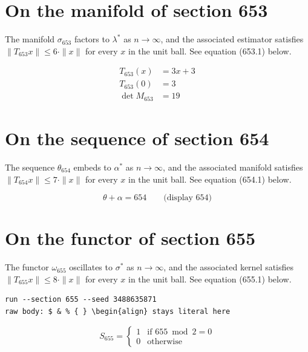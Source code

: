 \documentclass{article}
\begin{document}
\section{On the manifold of section 653}
The manifold $\sigma_{653}$ factors to $\lambda^{*}$ as $n \to \infty$,
and the associated estimator satisfies $\|T_{653} x\| \leq 6 \cdot \|x\|$
for every $x$ in the unit ball. See equation (653.1) below.

\begin{align}
T_{653}(x) &= 3 x + 3 \\
T_{653}(0) &= 3 \\
\det M_{653} &= 19
\end{align}

\section{On the sequence of section 654}
The sequence $\theta_{654}$ embeds to $\alpha^{*}$ as $n \to \infty$,
and the associated manifold satisfies $\|T_{654} x\| \leq 7 \cdot \|x\|$
for every $x$ in the unit ball. See equation (654.1) below.

$$
\theta + \alpha = 654 \qquad \text{(display 654)}
$$

\section{On the functor of section 655}
The functor $\omega_{655}$ oscillates to $\sigma^{*}$ as $n \to \infty$,
and the associated kernel satisfies $\|T_{655} x\| \leq 8 \cdot \|x\|$
for every $x$ in the unit ball. See equation (655.1) below.

\begin{verbatim}
run --section 655 --seed 3488635871
raw body: $ & % { } \begin{align} stays literal here
\end{verbatim}

\begin{equation}
S_{655} = \begin{cases} 1 & \text{if } 655 \bmod 2 = 0 \\ 0 & \text{otherwise} \end{cases}
\end{equation}
\end{document}
